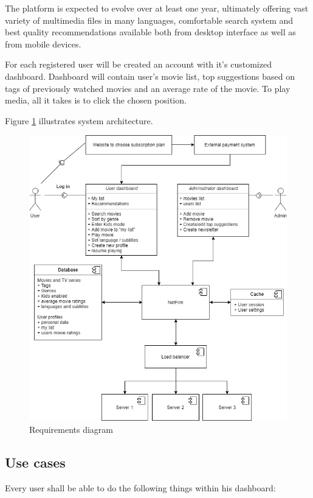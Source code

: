 \documentclass{scrreprt}
\begin{document}
The platform is expected to evolve over at least one year, ultimately offering vast variety of multimedia files in many languages, comfortable search system and best quality recommendations available both from desktop interface as well as from mobile devices.


For each registered user will be created an account with it's customized dashboard. Dashboard will contain user's movie list, top suggestions based on tags of previously watched movies and an average rate of the movie. To play media, all it takes is to click the chosen position. 

Figure \ref{fig:SysML} illustrates system architecture.\\

\begin{figure}[hp]
  \centering
  \includegraphics[width=1\textwidth]{img/sysml.jpg}
  \caption{Requirements diagram}
  \label{fig:SysML}
\end{figure}

\subsection{Use cases}

Every user shall be able to do the following things within his dashboard:
\end{document}
